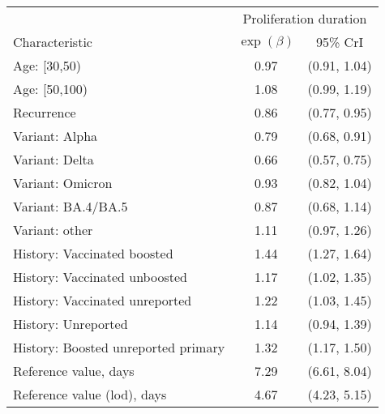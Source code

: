 \begin{appendix}
\begin{table}[p]
\begin{tabular}{lcc}
         \toprule
         & \multicolumn{2}{c}{Proliferation duration } \\
         Characteristic & $\exp(\beta)$ & 95\% CrI\\
         \midrule
         Age: [30,50) & 0.97 & (0.91, 1.04)\\
         Age: [50,100) & 1.08 & (0.99, 1.19)\\
         Recurrence & 0.86 & (0.77, 0.95)\\
         Variant: Alpha & 0.79 & (0.68, 0.91)\\
         Variant: Delta & 0.66 & (0.57, 0.75)\\
         Variant: Omicron & 0.93 & (0.82, 1.04)\\
         Variant: BA.4/BA.5 & 0.87 & (0.68, 1.14)\\
         Variant: other & 1.11 & (0.97, 1.26)\\
         History: Vaccinated boosted & 1.44 & (1.27, 1.64)\\
         History: Vaccinated unboosted & 1.17 & (1.02, 1.35)\\
         History: Vaccinated unreported & 1.22 & (1.03, 1.45)\\
         History: Unreported & 1.14 & (0.94, 1.39)\\
         History: Boosted unreported primary & 1.32 & (1.17, 1.50)\\
         \midrule
         Reference value, days & 7.29 & (6.61, 8.04)\\
         Reference value (lod), days & 4.67 & (4.23, 5.15)\\
         \bottomrule
         \end{tabular}
   \end{table}


\end{appendix}
